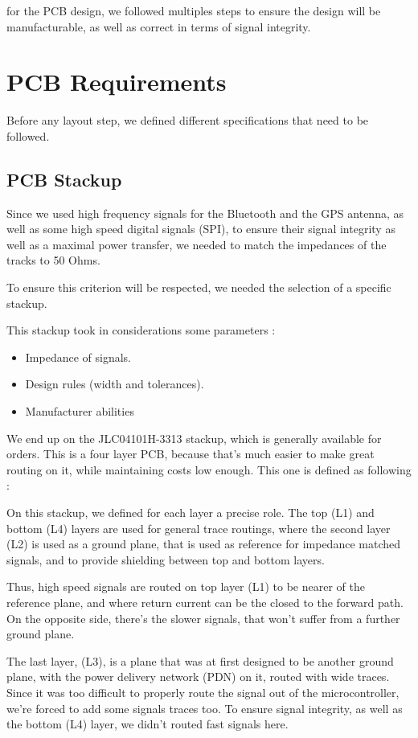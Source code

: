 for the PCB design, we followed multiples steps to ensure the design will be manufacturable, 
as well as correct in terms of signal integrity.

\section{PCB Requirements}
Before any layout step, we defined different specifications that need to be followed.

\subsection{PCB Stackup}
Since we used high frequency signals for the Bluetooth and the GPS antenna, as well as 
some high speed digital signals (SPI), to ensure their signal integrity as well as a 
maximal power transfer, we needed to match the impedances of the tracks to 50 Ohms.

To ensure this criterion will be respected, we needed the selection of a specific stackup.

This stackup took in considerations some parameters : 
\begin{itemize}
    \item   Impedance of signals.
    \item   Design rules (width and tolerances).
    \item   Manufacturer abilities
\end{itemize}

We end up on the JLC04101H-3313 stackup, which is generally available for orders. This is a four
layer PCB, because that's much easier to make great routing on it, while maintaining costs low
enough. This one is defined as following :



On this stackup, we defined for each layer a precise role.
The top (L1) and bottom (L4) layers are used for general trace routings, where the second 
layer (L2) is used as a ground plane, that is used as reference for impedance matched 
signals, and to provide shielding between top and bottom layers.

Thus, high speed signals are routed on top layer (L1) to be nearer of the reference plane, and
where return current can be the closed to the forward path. 
On the opposite side, there's the slower signals, that won't suffer from a further ground plane.

The last layer, (L3), is a plane that was at first designed to be another ground plane, with the
power delivery network (PDN) on it, routed with wide traces. Since it was too difficult to 
properly route the signal out of the microcontroller, we're forced to add some signals traces too.
To ensure signal integrity, as well as the bottom (L4) layer, we didn't routed fast signals here.

